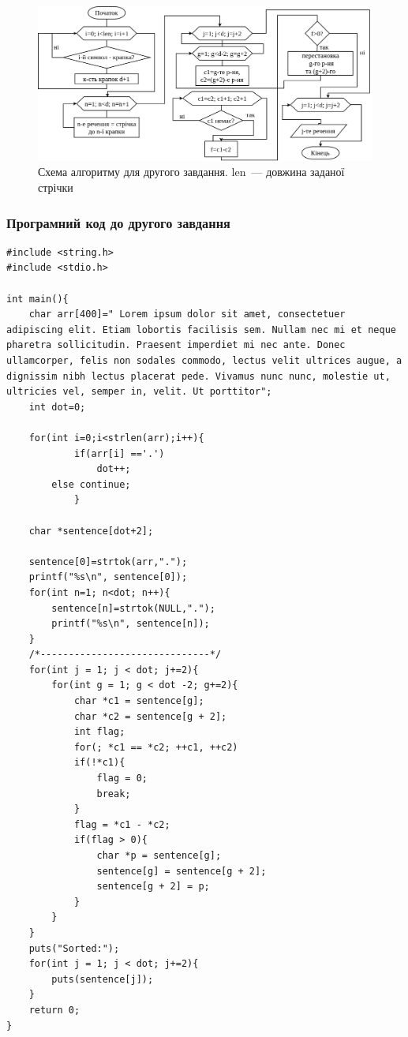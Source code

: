 \documentclass[12pt]{extreport}
\begin{document}
\begin{figure}[h]
	\centering
	\includegraphics[width=\textwidth]{d.png}
	\caption{Схема алгоритму для другого завдання. len~--- довжина заданої стрічки}
	\label{task2}
\end{figure}

\subsubsection*{Програмний код до другого завдання}

\begin{lstlisting}[frame=single]
#include <string.h>
#include <stdio.h>

int main(){
	char arr[400]=" Lorem ipsum dolor sit amet, consectetuer adipiscing elit. Etiam lobortis facilisis sem. Nullam nec mi et neque pharetra sollicitudin. Praesent imperdiet mi nec ante. Donec ullamcorper, felis non sodales commodo, lectus velit ultrices augue, a dignissim nibh lectus placerat pede. Vivamus nunc nunc, molestie ut, ultricies vel, semper in, velit. Ut porttitor";
	int dot=0;

	for(int i=0;i<strlen(arr);i++){
	        if(arr[i] =='.')
	            dot++;
		else continue;
	        }

	char *sentence[dot+2];

	sentence[0]=strtok(arr,".");
	printf("%s\n", sentence[0]);
	for(int n=1; n<dot; n++){
		sentence[n]=strtok(NULL,".");
		printf("%s\n", sentence[n]);
	}
	/*------------------------------*/
	for(int j = 1; j < dot; j+=2){
		for(int g = 1; g < dot -2; g+=2){
			char *c1 = sentence[g];
			char *c2 = sentence[g + 2];
			int flag;
			for(; *c1 == *c2; ++c1, ++c2)
			if(!*c1){
				flag = 0;
				break;
			}
			flag = *c1 - *c2;
			if(flag > 0){
				char *p = sentence[g];
				sentence[g] = sentence[g + 2];
				sentence[g + 2] = p;
			}
		}
	}
	puts("Sorted:");
	for(int j = 1; j < dot; j+=2){
		puts(sentence[j]);
	}
	return 0;
}
\end{lstlisting}
\end{document}
